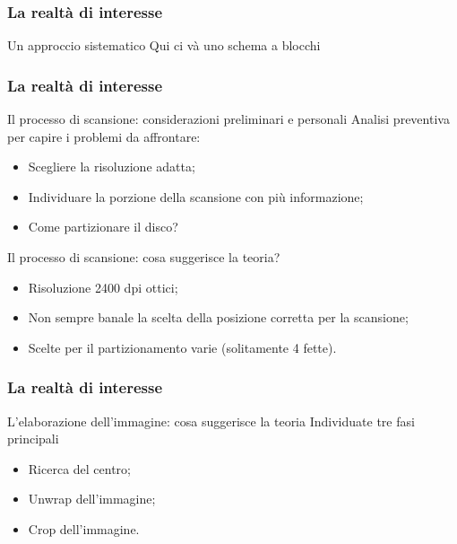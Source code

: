 \begin{frame}
\frametitle{La realtà di interesse}
\begin{block}{Un approccio sistematico}
Qui ci và uno schema a blocchi 
\end{block}
\end{frame}

\begin{frame}
\frametitle{La realtà di interesse}
\begin{block}{Il processo di scansione: considerazioni preliminari e personali}
Analisi preventiva per capire i problemi da affrontare:
\begin{itemize}
\item Scegliere la risoluzione adatta;
\item Individuare la porzione della scansione con più informazione;
\item Come partizionare il disco?
\end{itemize}
\end{block}

\begin{block}{Il processo di scansione: cosa suggerisce la teoria?}
\begin{itemize}
\item Risoluzione 2400 dpi ottici;
\item Non sempre banale la scelta della posizione corretta per la scansione;
\item Scelte per il partizionamento varie (solitamente 4 fette).
\end{itemize}
\end{block}
\end{frame}

\begin{frame}
\frametitle{La realtà di interesse}
\begin{block}{L'elaborazione dell'immagine: cosa suggerisce la teoria}
Individuate tre fasi principali
\begin{itemize}
\item Ricerca del centro;
\item Unwrap dell'immagine;
\item Crop dell'immagine.
\end{itemize}
\end{block}
\end{frame}

